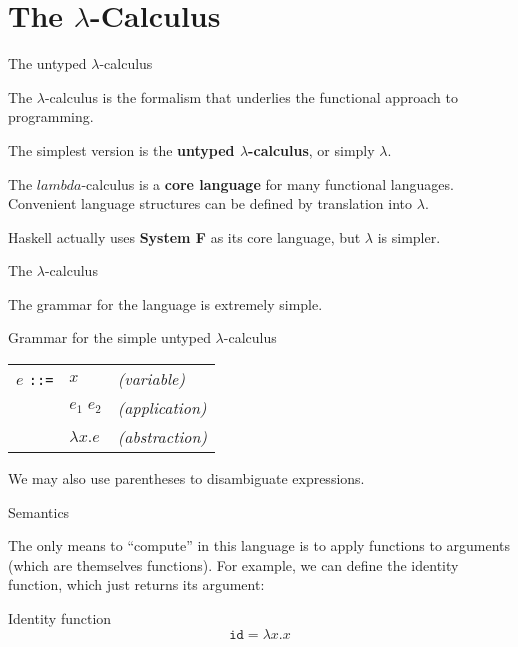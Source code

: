 
\section{The $\lambda$-Calculus}

%
\begin{frame}{The untyped $\lambda$-calculus}

The $\lambda$-calculus is the formalism that underlies the functional approach
to programming.

The simplest version is the \textbf{untyped $\lambda$-calculus}, or simply
$\lambda$.

The $lambda$-calculus is a \textbf{core language} for many functional languages.
Convenient language structures can be defined by translation into $\lambda$.

Haskell actually uses \textbf{System F} as its core language, but $\lambda$ is
simpler.

\end{frame}

%
\begin{frame}{The $\lambda$-calculus}

The grammar for the language is extremely simple.

\begin{block}{Grammar for the simple untyped $\lambda$-calculus}
\begin{tabular}{lll}
  $e$ \texttt{::=} & $x$              & \emph{(variable)} \\
                   & $e_1 \; e_2$     & \emph{(application)} \\
                   & $\lambda x . e$  & \emph{(abstraction)} \\
\end{tabular}
\end{block}

We may also use parentheses to disambiguate expressions.

\end{frame}

%
\begin{frame}{Semantics}

The only means to ``compute'' in this language is to apply functions to
arguments (which are themselves functions). For example, we can define the
identity function, which just returns its argument:

\begin{block}{Identity function}
\[
\mathtt{id} = \lambda x . x
\]
\end{block}

\end{frame}

